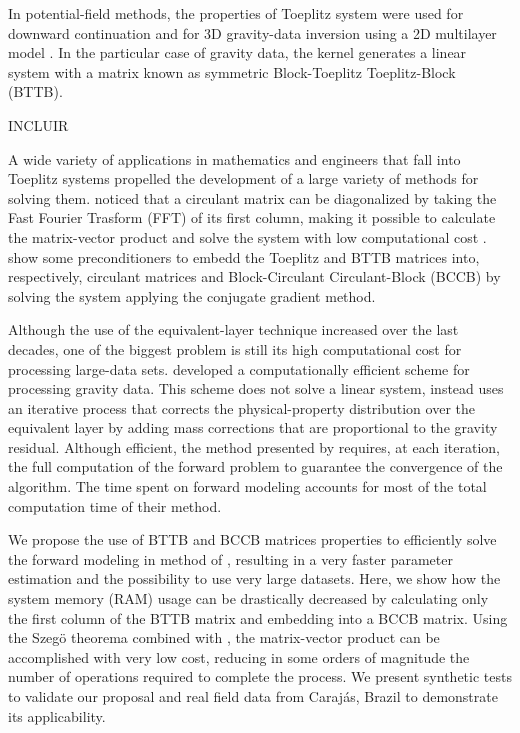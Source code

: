 In potential-field methods, the properties of Toeplitz system were used for downward continuation 
\citep{zhang-etal2016} and for 3D gravity-data inversion using a 2D multilayer model \citep{zhang-wong2015}. 
In the particular case of gravity data, the kernel generates a linear system with a matrix known as symmetric 
Block-Toeplitz Toeplitz-Block (BTTB).

INCLUIR \citet{qiang_etal2019}

A wide variety of applications in mathematics and engineers that fall into Toeplitz systems propelled the development 
of a large variety of  methods for solving them. 
\citet{grenander-szego1984} noticed that a circulant matrix can be diagonalized by taking the Fast Fourier Trasform 
(FFT) of its first column, making it possible to calculate the matrix-vector product and solve the system with 
low computational cost \citep{strang-aarikka1986, olkin1986}. \citet{chan-jin2007} show some preconditioners to embedd 
the Toeplitz and BTTB matrices into, respectively, circulant matrices and Block-Circulant Circulant-Block (BCCB) by 
solving the system applying the conjugate gradient method.

Although the use of the equivalent-layer technique increased over the last decades, one of the biggest problem is still 
its high computational cost for processing large-data sets. \citet{siqueira-etal2017} developed a computationally 
efficient scheme for processing gravity data. This scheme does not solve a linear system, instead uses an iterative 
process that corrects the physical-property distribution over the equivalent layer by adding mass corrections that 
are proportional to the gravity residual. Although efficient, the method presented by \citet{siqueira-etal2017} requires, 
at each iteration,  the full computation of the forward problem to guarantee the convergence of the algorithm. The 
time spent on forward modeling accounts for most of the total computation time of their method.

We propose the use of BTTB and BCCB matrices properties to efficiently  solve the forward modeling in method of 
\citet{siqueira-etal2017}, resulting in a very faster parameter estimation and the possibility to use very large 
datasets. Here, we show how the system memory (RAM) usage can be drastically decreased by calculating only the 
first column of the BTTB matrix and embedding into a BCCB matrix. Using the Szeg\"{o} theorema  combined with 
\cite{strang-aarikka1986}, the matrix-vector product can be accomplished with very low cost, reducing in some 
orders of magnitude the number of operations required to complete the process. We present synthetic tests to validate 
our proposal and real field data from Caraj\'as, Brazil to demonstrate its applicability.